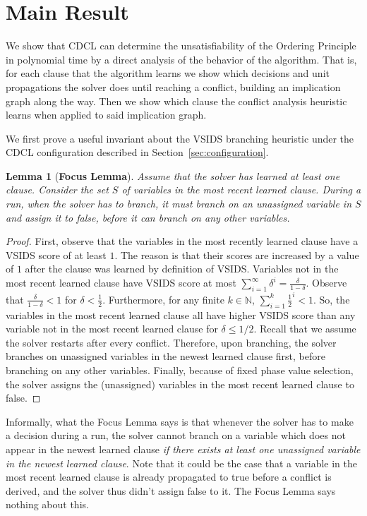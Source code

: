 \documentclass[10pt,a4paper]{article}
\newtheorem{lemma}[theorem]{Lemma}
\begin{document}
\section{Main Result}
\label{sec:main}
We show that CDCL can determine the unsatisfiability of the Ordering Principle in polynomial time by a direct analysis of the behavior of the algorithm. That is, for each clause that the algorithm learns we show which decisions and unit propagations the solver does until reaching a conflict, building an implication graph along the way. Then we show which clause the conflict analysis heuristic learns when applied to said implication graph.

We first prove a useful invariant about the VSIDS branching heuristic under the CDCL configuration described in Section~\ref{sec:configuration}.

\begin{lemma}[{\bf Focus Lemma}]
Assume that the solver has learned at least one clause. Consider the set $S$ of variables in the most recent learned clause. During a run, when the solver has to branch, it must branch on an unassigned variable in $S$ and assign it to false, before it can branch on any other variables.
\end{lemma}

\begin{proof}
First, observe that the variables in the most recently learned clause have a VSIDS score of at least $1$. The reason is that their scores are increased by a value of $1$ after the clause was learned by definition of VSIDS. Variables not in the most recent learned clause have VSIDS score at most $\sum_{i = 1}^\infty \delta^i = \frac{\delta}{1 - \delta}$. Observe that $\frac{\delta}{1 - \delta} < 1$ for $\delta < \frac{1}{2}$. Furthermore, for any finite $k \in \mathbb{N}$, $\sum_{i = 1}^k \frac{1}{2}^i < 1$. So, the variables in the most recent learned clause all have higher VSIDS score than any variable not in the most recent learned clause for $\delta \leq 1/2$. Recall that we assume the solver restarts after every conflict. Therefore, upon branching, the solver branches on unassigned variables in the newest learned clause first, before branching on any other variables. Finally, because of fixed phase value selection, the solver assigns the (unassigned) variables in the most recent learned clause to false.
\end{proof}

Informally, what the Focus Lemma says is that whenever the solver has to make a decision during a run, the solver cannot branch on a variable which does not appear in the newest learned clause \textit{if there exists at least one unassigned variable in the newest learned clause}. Note that it could be the case that a variable in the most recent learned clause is already propagated to true before a conflict is derived, and the solver thus didn't assign false to it. The Focus Lemma says nothing about this.
\end{document}
